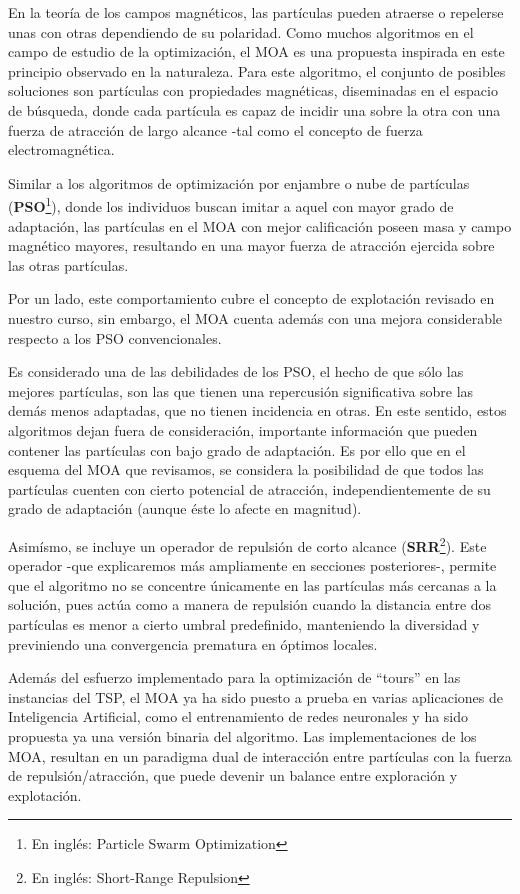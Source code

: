 \documentclass[12pt]{article}
\begin{document}
En la teoría de los campos magnéticos, las partículas pueden atraerse o repelerse unas con otras dependiendo de su polaridad.
Como muchos algoritmos en el campo de estudio de la optimización, el MOA es una propuesta inspirada en este principio observado en la naturaleza.
Para este algoritmo, el conjunto de posibles soluciones son partículas con propiedades magnéticas, diseminadas en el espacio de búsqueda, donde cada
partícula es capaz de incidir una sobre la otra con una fuerza de atracción de largo alcance -tal como el concepto de fuerza electromagnética.

Similar a los algoritmos de optimización por enjambre o nube de partículas (\textbf{PSO}\footnote{En inglés: Particle Swarm Optimization}), donde
los individuos buscan imitar a aquel con mayor grado de adaptación, las partículas en el MOA con mejor calificación poseen masa y campo
magnético mayores, resultando en una mayor fuerza de atracción ejercida sobre las otras partículas.

Por un lado, este comportamiento cubre el concepto de explotación revisado en nuestro curso, sin embargo, el MOA cuenta además con una mejora
considerable respecto a los PSO convencionales.

Es considerado una de las debilidades de los PSO, el hecho de que sólo las mejores partículas, son las que
tienen una repercusión significativa sobre las demás menos adaptadas, que no tienen incidencia en otras.
En este sentido, estos algoritmos dejan fuera de consideración, importante información que pueden contener las partículas con bajo grado de
adaptación. Es por ello que en el esquema del MOA que revisamos, se considera la posibilidad de que todos las partículas cuenten con cierto
potencial de atracción, independientemente de su grado de adaptación (aunque éste lo afecte en magnitud).

Asimísmo, se incluye un operador de repulsión de corto alcance (\textbf{SRR}\footnote{En inglés: Short-Range Repulsion}). Este operador -que explicaremos más ampliamente en secciones posteriores-, permite que el algoritmo no se concentre únicamente en las partículas más cercanas a la solución, pues actúa como a manera de repulsión cuando la distancia entre dos partículas es menor a cierto umbral predefinido, manteniendo la diversidad y previniendo una convergencia prematura en óptimos locales.

Además del esfuerzo implementado para la optimización de ``tours'' en las instancias del TSP, el MOA ya ha sido puesto a prueba en varias aplicaciones de Inteligencia Artificial, como el entrenamiento de redes neuronales y ha sido propuesta ya una versión binaria del algoritmo.
Las implementaciones de los MOA, resultan en un paradigma dual de interacción entre partículas con la fuerza de repulsión/atracción, que puede
devenir un balance entre exploración y explotación.
\end{document}
